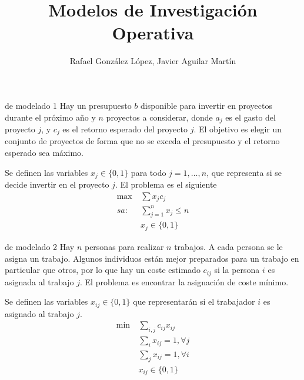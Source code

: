\documentclass[twoside]{article}
\begin{document}
\title{Modelos de Investigación Operativa}
\author{Rafael González López, Javier Aguilar Martín}
\maketitle

\begin{ejercicio}{de modelado 1}
Hay un presupuesto $b$ disponible para invertir en proyectos durante el próximo año y $n$ proyectos a considerar, donde $a_j$ es el gasto del proyecto $j$, y $c_j$ es el retorno esperado del proyecto $j$. El objetivo es elegir un conjunto de proyectos de forma que no se exceda el presupuesto y el retorno esperado sea máximo.
\end{ejercicio}
\begin{solucion}
Se definen las variables $x_j\in\{0,1\}$ para todo $j=1,\dots, n$, que representa si se decide invertir en el proyecto $j$. El problema es el siguiente
\begin{align*}
\max\ & \sum x_jc_j\\
sa:\ & \sum_{j=1}^n x_j\leq n\\
& x_j\in\{0,1\}
\end{align*}
\end{solucion}

\newpage

\begin{ejercicio}{de modelado 2}
Hay $n$ personas para realizar $n$ trabajos. A cada persona se le asigna un trabajo. Algunos individuos están mejor preparados para un trabajo en particular que otros, por lo que hay un coste estimado $c_{ij}$ si la persona $i$ es asignada al trabajo $j$. El problema es encontrar la asignación de coste mínimo.
\end{ejercicio}
Se definen las variables $x_{ij}\in\{0,1\}$ que representarán si el trabajador $i$ es asignado al trabajo $j$. 
\begin{align*}
\min\ & \sum_{i,j}c_{ij}x_{ij}\\
& \sum_i x_{ij}=1, \forall j\\
& \sum_j x_{ij}=1, \forall i\\
& x_{ij}\in\{0,1\}
\end{align*}
\begin{solucion}
\end{solucion}

\newpage
\end{document}
